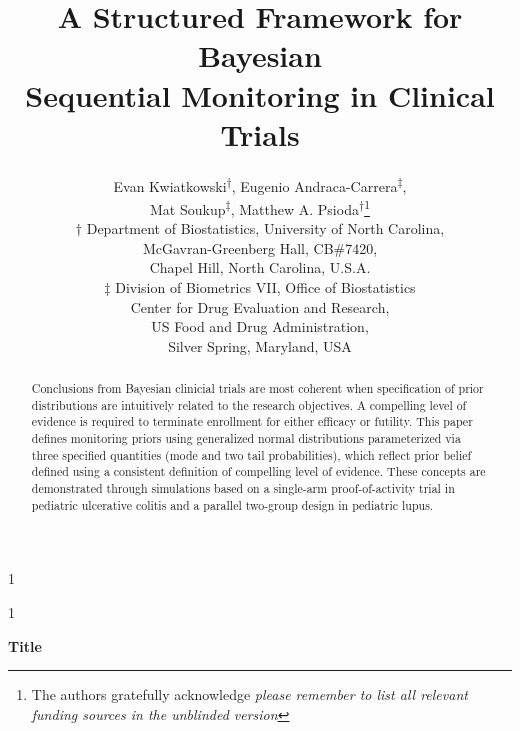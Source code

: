 \documentclass[12pt]{article}
\newcommand{\blind}{1}
\begin{document}
\def\spacingset#1{\renewcommand{\baselinestretch}%
{#1}\small\normalsize} \spacingset{1}



\blind
{
  \title{\bf A Structured Framework for Bayesian \\Sequential Monitoring in Clinical Trials}
  \author{Evan Kwiatkowski\textsuperscript{$\dagger$}, 
	        Eugenio Andraca-Carrera\textsuperscript{$\ddagger$},\\
					Mat Soukup\textsuperscript{$\ddagger$},
					\medskip Matthew A. Psioda\textsuperscript{$\dagger$}\thanks{The authors gratefully acknowledge \textit{please remember to list all relevant funding sources in the unblinded version}}\\
	  $\dagger$ Department of Biostatistics,
		University of North Carolina, \\
		McGavran-Greenberg Hall, CB\#7420, \\
		\medskip Chapel Hill, North Carolina, U.S.A.\\
    $\ddagger$ Division of Biometrics VII, Office of Biostatistics \\
		           Center for Drug Evaluation and Research, \\
							 US Food and Drug Administration, \\
							 Silver Spring, Maryland, USA \\									
		}
  \maketitle
} \fi

\blind
{
  \bigskip
  \bigskip
  \bigskip
  \begin{center}
    {\LARGE\bf Title}
\end{center}
  \medskip
} \fi

\bigskip
\begin{abstract}
Conclusions from Bayesian clinicial trials are most coherent when specification of prior distributions are intuitively related to the research objectives. A compelling level of evidence is required to terminate enrollment for either efficacy or futility. This paper defines monitoring priors using generalized normal distributions parameterized via three specified quantities (mode and two tail probabilities), which reflect prior belief defined using a consistent definition of compelling level of evidence. These concepts are demonstrated through simulations based on a single-arm proof-of-activity trial in pediatric ulcerative colitis and a parallel two-group design in pediatric lupus.
\end{abstract}
\end{document}
